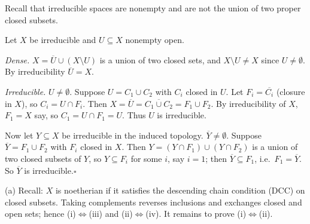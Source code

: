\documentclass[11pt]{article}
\begin{document}
\pf
Recall that irreducible spaces are nonempty and are not the union of two proper closed subsets.

Let $X$ be irreducible and $U\subseteq X$ nonempty open.

\emph{Dense.} $X=\overline U\cup(X\setminus U)$ is a union of two closed sets, and $X\setminus U\ne X$ since $U\ne\emptyset$. By irreducibility $\overline U=X$.

\emph{Irreducible.} $U\ne\emptyset$. Suppose $U=C_1\cup C_2$ with $C_i$ closed in $U$. Let $F_i=\overline{C_i}$ (closure in $X$), so $C_i=U\cap F_i$. Then $X=\overline U=\overline{C_1\cup C_2}=F_1\cup F_2$. By irreducibility of $X$, $F_1=X$ say, so $C_1=U\cap F_1=U$. Thus $U$ is irreducible.

Now let $Y\subseteq X$ be irreducible in the induced topology. $\overline Y\ne\emptyset$. Suppose $\overline Y=F_1\cup F_2$ with $F_i$ closed in $X$. Then $Y=(Y\cap F_1)\cup(Y\cap F_2)$ is a union of two closed subsets of $Y$, so $Y\subseteq F_i$ for some $i$, say $i=1$; then $\overline Y\subseteq F_1$, i.e.\ $F_1=\overline Y$. So $\overline Y$ is irreducible.\hfill$\square$

\pf
(a) Recall: $X$ is noetherian if it satisfies the descending chain condition (DCC) on closed subsets. Taking complements reverses inclusions and exchanges closed and open sets; hence (i)$\Leftrightarrow$(iii) and (ii)$\Leftrightarrow$(iv). It remains to prove (i)$\Leftrightarrow$(ii).
\end{document}
